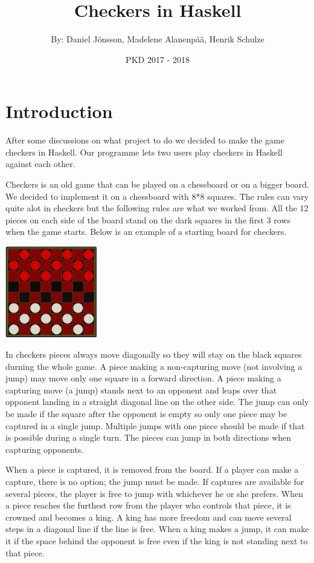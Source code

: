 \documentclass[12pt,a4paper]{article}
\title{Checkers in Haskell}
\author{By: Daniel Jönsson, Madelene Alanenpää, Henrik Schulze }
\date{PKD 2017 - 2018}
\begin{document}
\maketitle
\newpage
\tableofcontents
\newpage

\section{Introduction}
After some discussions on what project to do we decided to make the game checkers in Haskell. Our programme lets two users play checkers in Haskell against each other. 

Checkers is an old game that can be played on a chessboard or on a bigger board. We decided to implement it on a chessboard with 8*8 squares. The rules can vary quite alot in checkers but the following rules are what we worked from. All the 12 pieces on each side of the board stand on the dark squares in the first 3 rows when the game starts. Below is an example of a starting board for checkers.

\begin{center}
	\includegraphics[width= 0.3\textwidth]{Startboarexample.PNG}	
\end{center}


In checkers pieces always move diagonally so they will stay on the black squares durning the whole game. A piece making a non-capturing move (not involving a jump) may move only one square in a forward direction. A piece making a capturing move (a jump) stands next to an opponent and leaps over that opponent landing in a straight diagonal line on the other side. The jump can only be made if the square after the opponent is empty so only one piece may be captured in a single jump. Multiple jumps with one piece should be made if that is possible during a single turn. The pieces can jump in both directions when capturing opponents.

When a piece is captured, it is removed from the board. If a player can make a capture, there is no option; the jump must be made. If captures are available for several pieces, the player is free to jump with whichever he or she prefers. When a piece reaches the furthest row from the player who controls that piece, it is crowned and becomes a king. A king has more freedom and can move several steps in a diagonal line if the line is free. When a king makes a jump, it can make it if the space behind the opponent is free even if the king is not standing next to that piece.
\end{document}
